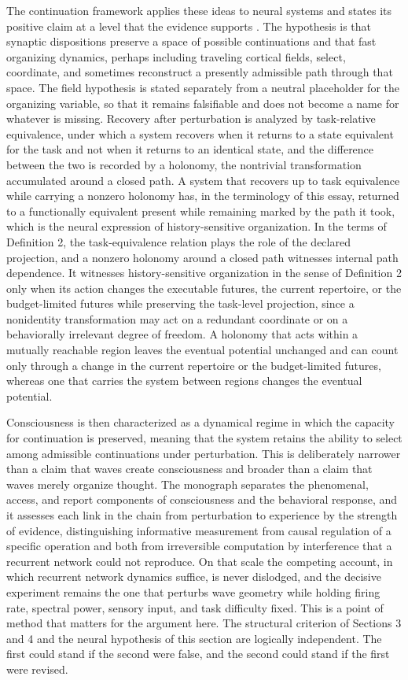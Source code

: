 \documentclass[11pt]{article}
\theoremstyle{definition}
\theoremstyle{plain}
\theoremstyle{remark}
\begin{document}
The continuation framework applies these ideas to neural systems and states its positive claim at a level that the evidence supports \cite{flyxion2026continuation}. The hypothesis is that synaptic dispositions preserve a space of possible continuations and that fast organizing dynamics, perhaps including traveling cortical fields, select, coordinate, and sometimes reconstruct a presently admissible path through that space. The field hypothesis is stated separately from a neutral placeholder for the organizing variable, so that it remains falsifiable and does not become a name for whatever is missing. Recovery after perturbation is analyzed by task-relative equivalence, under which a system recovers when it returns to a state equivalent for the task and not when it returns to an identical state, and the difference between the two is recorded by a holonomy, the nontrivial transformation accumulated around a closed path. A system that recovers up to task equivalence while carrying a nonzero holonomy has, in the terminology of this essay, returned to a functionally equivalent present while remaining marked by the path it took, which is the neural expression of history-sensitive organization. In the terms of Definition 2, the task-equivalence relation plays the role of the declared projection, and a nonzero holonomy around a closed path witnesses internal path dependence. It witnesses history-sensitive organization in the sense of Definition 2 only when its action changes the executable futures, the current repertoire, or the budget-limited futures while preserving the task-level projection, since a nonidentity transformation may act on a redundant coordinate or on a behaviorally irrelevant degree of freedom. A holonomy that acts within a mutually reachable region leaves the eventual potential unchanged and can count only through a change in the current repertoire or the budget-limited futures, whereas one that carries the system between regions changes the eventual potential.

Consciousness is then characterized as a dynamical regime in which the capacity for continuation is preserved, meaning that the system retains the ability to select among admissible continuations under perturbation. This is deliberately narrower than a claim that waves create consciousness and broader than a claim that waves merely organize thought. The monograph separates the phenomenal, access, and report components of consciousness and the behavioral response, and it assesses each link in the chain from perturbation to experience by the strength of evidence, distinguishing informative measurement from causal regulation of a specific operation and both from irreversible computation by interference that a recurrent network could not reproduce. On that scale the competing account, in which recurrent network dynamics suffice, is never dislodged, and the decisive experiment remains the one that perturbs wave geometry while holding firing rate, spectral power, sensory input, and task difficulty fixed. This is a point of method that matters for the argument here. The structural criterion of Sections 3 and 4 and the neural hypothesis of this section are logically independent. The first could stand if the second were false, and the second could stand if the first were revised.
\end{document}

